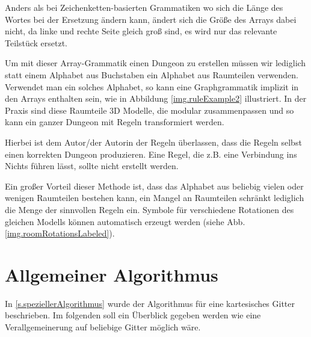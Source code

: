 

Anders als bei Zeichenketten-basierten Grammatiken wo sich die Länge des Wortes bei der Ersetzung ändern kann, ändert sich die Größe des Arrays dabei nicht, da linke und rechte Seite gleich groß sind, es wird nur das relevante Teilstück ersetzt.


Um mit dieser Array-Grammatik einen Dungeon zu erstellen müssen wir lediglich statt einem Alphabet aus Buchstaben ein Alphabet aus Raumteilen verwenden. Verwendet man ein solches Alphabet, so kann eine Graphgrammatik implizit in den Arrays enthalten sein, wie in Abbildung \ref{img.ruleExample2} illustriert. In der Praxis sind diese Raumteile 3D Modelle, die modular zusammenpassen und so kann ein ganzer Dungeon mit Regeln transformiert werden.

Hierbei ist dem Autor/der Autorin der Regeln überlassen, dass die Regeln selbst einen korrekten Dungeon produzieren. Eine Regel, die z.B. eine Verbindung ins Nichts führen lässt, sollte nicht erstellt werden. 


Ein großer Vorteil dieser Methode ist, dass das Alphabet aus beliebig vielen oder wenigen Raumteilen bestehen kann, ein Mangel an Raumteilen schränkt lediglich die Menge der sinnvollen Regeln ein. Symbole für verschiedene Rotationen des gleichen Modells können automatisch erzeugt werden (siehe Abb. \ref{img.roomRotationsLabeled}).


\section{Allgemeiner Algorithmus}\label{s.allgemeinerAlgorithmus}

In \ref{s.speziellerAlgorithmus} wurde der Algorithmus für eine kartesisches Gitter beschrieben. Im folgenden soll ein Überblick gegeben werden wie eine Verallgemeinerung auf beliebige Gitter möglich wäre.

